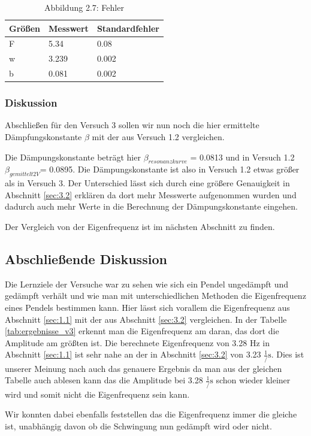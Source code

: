             \begin{table}[H]
                \centering
                \label{tab:Fehler}
                \caption{Abbildung 2.7: Fehler}
                \vspace{0.5em}
                \begin{tabular}{|l|l|l|}
                    \hline
                    Größen & Messwert & Standardfehler \\
                    \hline
                    F & 5.34 & 0.08 \\
                    \hline
                    w & 3.239 & 0.002 \\
                    \hline
                    b & 0.081 & 0.002 \\
                    \hline
                \end{tabular}
            \end{table}

            \newpage
        \subsubsection{Diskussion}
        Abschließen für den Versuch 3 sollen wir nun noch die hier ermittelte Dämpfungskonstante $\beta$ mit der aus Versuch 1.2 vergleichen. 

        Die Dämpungskonstante beträgt hier $\beta_{resonanzkurve}$ = 0.0813 und in Versuch 1.2 $\beta_{gemittelt2V}$= 0.0895. Die Dämpungskonstante ist also in Versuch 1.2 etwas größer als in Versuch 3. Der Unterschied lässt sich durch eine größere Genauigkeit in Abschnitt \ref{sec:3.2} erklären da dort mehr Messwerte aufgenommen wurden und dadurch auch mehr Werte in die Berechnung der Dämpungskonstante eingehen.

        \noindent Der Vergleich von der Eigenfrequenz ist im nächsten Abschnitt zu finden. 

    \subsection{Abschließende Diskussion}
    Die Lernziele der Versuche war zu sehen wie sich ein Pendel ungedämpft und gedämpft verhält und wie man mit unterschiedlichen Methoden die Eigenfrequenz eines Pendels bestimmen kann. Hier lässt sich vorallem die Eigenfrequenz aus Abschnitt \ref{sec:1.1} mit der aus Abschnitt \ref{sec:3.2} vergleichen. In der Tabelle \ref{tab:ergebnisse_v3} erkennt man die Eigenfrequenz am daran, das dort die Amplitude am größten ist. Die berechnete Eigenfrequenz von 3.28 Hz in Abschnitt \ref{sec:1.1} ist sehr nahe an der in Abschnitt \ref{sec:3.2} von 3.23 $\frac{1}/{\mathrm{s}}$. Dies ist unserer Meinung nach auch das genauere Ergebnis da man aus der gleichen Tabelle auch ablesen kann das die Amplitude bei 3.28 $\frac{1}/{\mathrm{s}}$ schon wieder kleiner wird und somit nicht die Eigenfrequenz sein kann.
    
    \noindent Wir konnten dabei ebenfalls feststellen das die Eigenfrequenz immer die gleiche ist, unabhängig davon ob die Schwingung nun gedämpft wird oder nicht.
